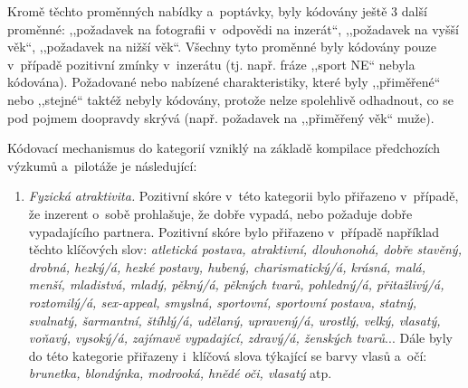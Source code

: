 \documentclass[a4paper, 12pt, notitlepage, oneside, numbers=noenddot]{report}
\begin{document}
Kromě těchto proměnných nabídky a~poptávky, byly kódovány ještě 3
další proměnné: ,,požadavek na fotografii v~odpovědi na inzerát``,
,,požadavek na vyšší věk``, ,,požadavek na nižší věk``. Všechny tyto
proměnné byly kódovány pouze v~případě pozitivní zmínky v~inzerátu
(tj. např. fráze ,,sport NE`` nebyla kódována). Požadované nebo
nabízené charakteristiky, které byly ,,přiměřené`` nebo ,,stejné``
taktéž nebyly kó\-do\-vá\-ny, protože nelze spolehlivě odhadnout, co
se pod pojmem doopravdy skrývá (např. požadavek na ,,přiměřený věk``
muže).

Kódovací mechanismus do kategorií vzniklý na základě kompilace předchozích výzkumů
a~pilotáže je následující:

\begin{enumerate}
\item \emph{Fyzická atraktivita.} Pozitivní skóre v~této kategorii
  bylo přiřazeno v~případě, že inzerent o~sobě prohlašuje, že dobře
  vypadá, nebo požaduje dobře vypadajícího partnera. Pozitivní skóre
  bylo přiřazeno v~případě například těchto klíčových slov:
  \emph{atletická postava, atraktivní, dlouhonohá, dobře stavěný,
    drobná, hezký/á, hezké postavy, hubený, charismatický/á, krásná,
    malá, menší, mladistvá, mladý, pěkný/á, pěkných tvarů, pohledný/á,
    přitažlivý/á, roztomilý/á, sex-appeal, smyslná, sportovní,
    sportovní postava, statný, svalnatý, šarmantní, štíhlý/á, udělaný,
    upravený/á, u\-rost\-lý, velký, vlasatý, voňavý, vysoký/á, zajímavě
    vypadající, zdravý/á, ženských tvarů}...  Dále byly do této
  kategorie přiřazeny i~klíčová slova týkající se barvy vlasů a~očí:
  \emph{brunetka, blondýnka, modrooká, hnědé oči, vlasatý} atp.


\end{enumerate}
\end{document}
